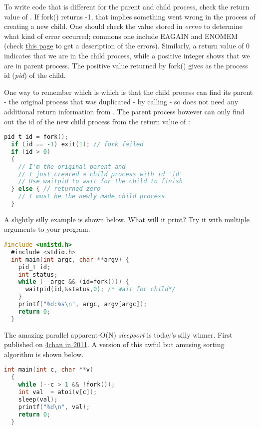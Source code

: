 To write code that is different for the parent and child process, check the return value of . If fork() returns -1, that implies something went wrong in the process of creating a new child. One should check the value stored in \emph{errno} to determine what kind of error occurred; commons one include EAGAIN and ENOMEM (check \href{http://www-numi.fnal.gov/offline_software/srt_public_context/WebDocs/Errors/unix_system_errors.html}{this page} to get a description of the errors). Similarly, a return value of 0 indicates that we are in the child process, while a positive integer shows that we are in parent process. The positive value returned by fork() gives as the process id (\emph{pid}) of the child.

One way to remember which is which is that the child process can find its parent - the original process that was duplicated - by calling  - so does not need any additional return information from . The parent process however can only find out the id of the new child process from the return value of :

\begin{lstlisting}[language=C]
  pid_t id = fork();
  if (id == -1) exit(1); // fork failed 
  if (id > 0)
  { 
    // I'm the original parent and 
    // I just created a child process with id 'id'
    // Use waitpid to wait for the child to finish
  } else { // returned zero
    // I must be the newly made child process
  }
\end{lstlisting}

A slightly silly example is shown below. What will it print? Try it with multiple arguments to your program.

\begin{lstlisting}[language=C]
  #include <unistd.h>
  #include <stdio.h>
  int main(int argc, char **argv) {
    pid_t id;
    int status; 
    while (--argc && (id=fork())) {
      waitpid(id,&status,0); /* Wait for child*/
    }
    printf("%d:%s\n", argc, argv[argc]);
    return 0;
  }
\end{lstlisting}

The amazing parallel apparent-O(N) \emph{sleepsort} is today's silly winner. First published on \href{https://dis.4chan.org/read/prog/1295544154}{4chan in 2011}. A version of this awful but amusing sorting algorithm is shown below.

\begin{lstlisting}[language=C]
  int main(int c, char **v)
  {
    while (--c > 1 && !fork());
    int val  = atoi(v[c]);
    sleep(val);
    printf("%d\n", val);
    return 0;
  }
\end{lstlisting}

